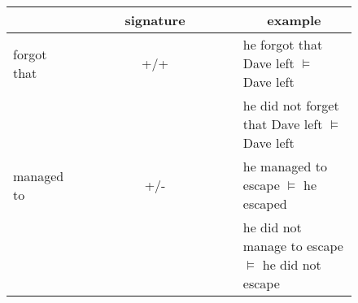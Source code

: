 
\begin{figure}
\begin{center}
  \begin{tabular}{l c l}
    \hline
   	 & ~~~~~~signature~~~~~~ &  \multicolumn{1}{c}{example} \\
   	\hline
   	forgot that      & +/+ & he forgot that Dave left $\vDash$ Dave left \\
   	                 &     & he did not forget that Dave left $\vDash$ Dave left \\
   	\hline
   	managed to       & +/- & he managed to escape $\vDash$ he escaped \\
   	                 &     & he did not manage to escape $\vDash$ he did not escape \\
   	\hline

\end{tabular}
\end{center}
\end{figure}

